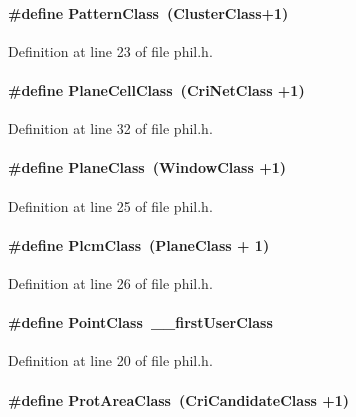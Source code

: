 \paragraph{\setlength{\rightskip}{0pt plus 5cm}\#define Pattern\-Class\ (Cluster\-Class+1)}\hfill



Definition at line 23 of file phil.h.\label{phil.h_a12}
\paragraph{\setlength{\rightskip}{0pt plus 5cm}\#define Plane\-Cell\-Class\ (Cri\-Net\-Class +1)}\hfill



Definition at line 32 of file phil.h.\label{phil.h_a5}
\paragraph{\setlength{\rightskip}{0pt plus 5cm}\#define Plane\-Class\ (Window\-Class +1)}\hfill



Definition at line 25 of file phil.h.\label{phil.h_a6}
\paragraph{\setlength{\rightskip}{0pt plus 5cm}\#define Plcm\-Class\ (Plane\-Class + 1)}\hfill



Definition at line 26 of file phil.h.\label{phil.h_a0}
\paragraph{\setlength{\rightskip}{0pt plus 5cm}\#define Point\-Class\ \_\-\_\-first\-User\-Class}\hfill



Definition at line 20 of file phil.h.\label{phil.h_a14}
\paragraph{\setlength{\rightskip}{0pt plus 5cm}\#define Prot\-Area\-Class\ (Cri\-Candidate\-Class +1)}\hfill



